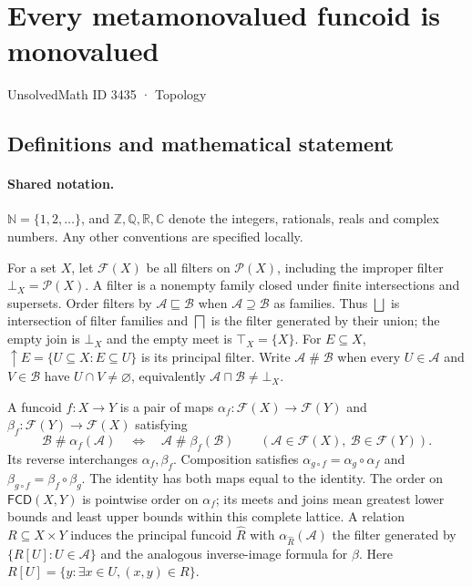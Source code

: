 \documentclass[11pt]{article}
\begin{document}
\setcounter{section}{3434}
\section{Every metamonovalued funcoid is monovalued}\label{3435}
{\small\sffamily UnsolvedMath ID 3435 · Topology}
\subsection{Definitions and mathematical statement}

\paragraph{Shared notation.}$\mathbb N=\{1,2,\ldots\}$, and $\mathbb Z,\mathbb Q,\mathbb R,\mathbb C$ denote the integers, rationals, reals and complex numbers. Any other conventions are specified locally.


For a set $X$, let $\mathcal F(X)$ be all filters on $\mathcal P(X)$, including the improper filter $\bot_X=\mathcal P(X)$. A filter is a nonempty family closed under finite intersections and supersets. Order filters by $\mathcal A\sqsubseteq\mathcal B$ when $\mathcal A\supseteq\mathcal B$ as families. Thus $\bigsqcup$ is intersection of filter families and $\bigsqcap$ is the filter generated by their union; the empty join is $\bot_X$ and the empty meet is $\top_X=\{X\}$. For $E\subseteq X$, $\uparrow E=\{U\subseteq X:E\subseteq U\}$ is its principal filter. Write $\mathcal A\mathrel{\#}\mathcal B$ when every $U\in\mathcal A$ and $V\in\mathcal B$ have $U\cap V\ne\varnothing$, equivalently $\mathcal A\sqcap\mathcal B\ne\bot_X$.

A funcoid $f:X\to Y$ is a pair of maps $\alpha_f:\mathcal F(X)\to\mathcal F(Y)$ and $\beta_f:\mathcal F(Y)\to\mathcal F(X)$ satisfying
\[
 \mathcal B\mathrel{\#}\alpha_f(\mathcal A)
 \quad\Longleftrightarrow\quad
 \mathcal A\mathrel{\#}\beta_f(\mathcal B)
 \qquad(\mathcal A\in\mathcal F(X),\ \mathcal B\in\mathcal F(Y)).
\]
Its reverse interchanges $\alpha_f,\beta_f$. Composition satisfies $\alpha_{g\circ f}=\alpha_g\circ\alpha_f$ and $\beta_{g\circ f}=\beta_f\circ\beta_g$. The identity has both maps equal to the identity. The order on $\mathsf{FCD}(X,Y)$ is pointwise order on $\alpha_f$; its meets and joins mean greatest lower bounds and least upper bounds within this complete lattice. A relation $R\subseteq X\times Y$ induces the principal funcoid $\widehat R$ with $\alpha_{\widehat R}(\mathcal A)$ the filter generated by $\{R[U]:U\in\mathcal A\}$ and the analogous inverse-image formula for $\beta$. Here $R[U]=\{y:\exists x\in U,(x,y)\in R\}$.
\end{document}
